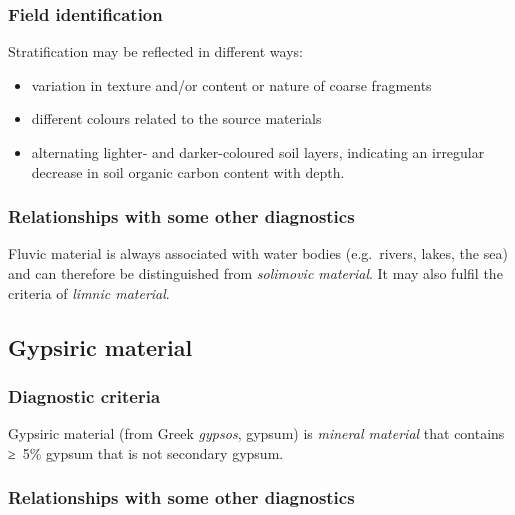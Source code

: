 \documentclass[
  letterpaper,
  DIV=11,
  numbers=noendperiod]{scrreprt}
\providecommand{\tightlist}{%
  \setlength{\itemsep}{0pt}\setlength{\parskip}{0pt}}\usepackage{longtable,booktabs,array}
\begin{document}
\hypertarget{field-identification-42}{%
\subsubsection{Field identification}\label{field-identification-42}}

Stratification may be reflected in different ways:

\begin{itemize}
\tightlist
\item
  variation in texture and/or content or nature of coarse fragments
\item
  different colours related to the source materials
\item
  alternating lighter- and darker-coloured soil layers, indicating an
  irregular decrease in soil organic carbon content with depth.
\end{itemize}

\hypertarget{relationships-with-some-other-diagnostics-55}{%
\subsubsection{Relationships with some other
diagnostics}\label{relationships-with-some-other-diagnostics-55}}

Fluvic material is always associated with water bodies (e.g.~rivers,
lakes, the sea) and can therefore be distinguished from \emph{solimovic
material}. It may also fulfil the criteria of \emph{limnic material}.

\hypertarget{gypsiric-material}{%
\subsection{Gypsiric material}\label{gypsiric-material}}

\hypertarget{diagnostic-criteria-63}{%
\subsubsection{Diagnostic criteria}\label{diagnostic-criteria-63}}

Gypsiric material (from Greek \emph{gypsos}, gypsum) is \emph{mineral
material} that contains ≥~5\% gypsum that is not secondary gypsum.

\hypertarget{relationships-with-some-other-diagnostics-56}{%
\subsubsection{Relationships with some other
diagnostics}\label{relationships-with-some-other-diagnostics-56}}
\end{document}
